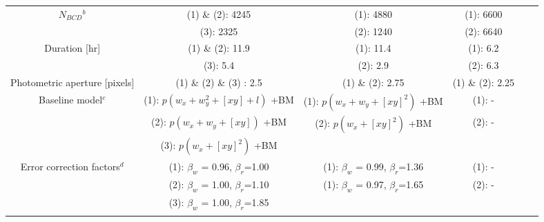 \documentclass[traditabstract]{aa}
\begin{document}
\begin{appendix}
\begin{table*}
\begin{center}
{\begin{tabular}{cccccc}
$N_{BCD}$$^b$                                                & (1) \& (2): 4245                   & (1): 4880                      & (1): 6600                   \\ \noalign {\smallskip} 
                                                                           & (3): 2325                               &  (2): 1240                   & (2): 6640                            \\ \noalign {\smallskip} 
Duration  [hr]                                                      & (1) \& (2): 11.9                               & (1): 11.4                      & (1): 6.2                      \\ \noalign {\smallskip}  
                                                                           & (3): 5.4                           &  (2): 2.9                       &   (2): 6.3                                    \\ \noalign {\smallskip} 
Photometric aperture [pixels]                             & (1) \& (2) \& (3) : 2.5                              &  (1) \& (2): 2.75                       & (1)  \& (2): 2.25                         \\ \noalign {\smallskip}  
Baseline  model$^c$   & (1): $p(w_x +  w_y^2 + [xy] + l) $ +BM         & (1): $p(w_x + w_y + [xy]^2) $ +BM  & (1): -     \\ \noalign {\smallskip} 
                                    & (2): $p(w_x +  w_y + [xy]) $ +BM          &  (2):  $p(w_x + [xy]^2) $ +BM        &  (2):  -    \\ \noalign {\smallskip} 
                                    & (3): $p(w_x  + [xy]^2) $ +BM         &                                                       &                                      \\ \noalign {\smallskip}                                                       
Error correction factors$^d$         & (1): $\beta_w$ = 0.96, $\beta_r$=1.00     &  (1):  $\beta_w$ = 0.99, $\beta_r$=1.36 & (1):  -     \\ \noalign {\smallskip} 
                                                     & (2): $\beta_w$ = 1.00, $\beta_r$=1.10    & (1):  $\beta_w$ = 0.97, $\beta_r$=1.65    &   (2):  -            \\ \noalign {\smallskip} 
                                                     & (3): $\beta_w$ = 1.00, $\beta_r$=1.85   &                                                                   &            \\ \noalign {\smallskip} 


\end{tabular}}
\end{center}
\end{table*}
\end{appendix}
\end{document}
